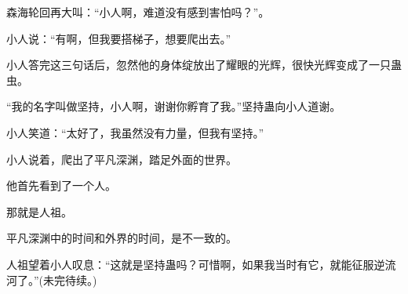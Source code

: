 \begin{this_body}
森海轮回再大叫：“小人啊，难道没有感到害怕吗？”。

小人说：“有啊，但我要搭梯子，想要爬出去。”

小人答完这三句话后，忽然他的身体绽放出了耀眼的光辉，很快光辉变成了一只蛊虫。

“我的名字叫做坚持，小人啊，谢谢你孵育了我。”坚持蛊向小人道谢。

小人笑道：“太好了，我虽然没有力量，但我有坚持。”

小人说着，爬出了平凡深渊，踏足外面的世界。

他首先看到了一个人。

那就是人祖。

平凡深渊中的时间和外界的时间，是不一致的。

人祖望着小人叹息：“这就是坚持蛊吗？可惜啊，如果我当时有它，就能征服逆流河了。”(未完待续。)

\end{this_body}


